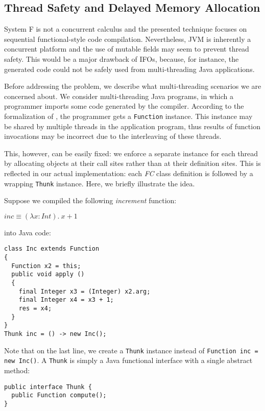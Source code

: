 \subsection{Thread Safety and Delayed Memory Allocation}

System F is not a concurrent calculus and the presented technique
focuses on sequential functional-style code compilation. Nevertheless,
JVM is inherently a concurrent platform and the use of mutable fields
may seem to prevent thread safety. This would be a major drawback of
IFOs, because, for instance, the generated code could not be safely
used from multi-threading Java applications.

Before addressing the problem, we describe what multi-threading 
scenarios we are concerned about. We consider multi-threading Java programs, in which a programmer imports
some code generated by the compiler. According to the formalization of \Name, the programmer
gets a \lstinline{Function} instance. This instance may be shared
by multiple threads in the application program, thus results of
function invocations may be incorrect due to the interleaving of
these threads.

This, however, can be easily fixed: we enforce a separate
instance for each thread by allocating objects at their call sites
rather than at their definition sites. This is reflected in our actual
implementation: each \emph{FC} class definition is followed by a wrapping \lstinline{Thunk}
instance. Here, we briefly illustrate the idea.

Suppose we compiled the following \emph{increment} function:

\vspace{5pt}
$inc \equiv (\lambda x : Int)  .~x+1$
\vspace{5pt}

\noindent into Java code:

\begin{lstlisting}
class Inc extends Function
{
  Function x2 = this;
  public void apply ()
  {
    final Integer x3 = (Integer) x2.arg;
    final Integer x4 = x3 + 1;
    res = x4;
  }
}
Thunk inc = () -> new Inc();
\end{lstlisting}

\noindent Note that on the last line, we create a \lstinline{Thunk}
instance instead of \lstinline{Function inc = new Inc()}. A \lstinline{Thunk} is
simply a Java functional interface with a single abstract method:

\begin{lstlisting}
public interface Thunk {
  public Function compute();
}
\end{lstlisting}

